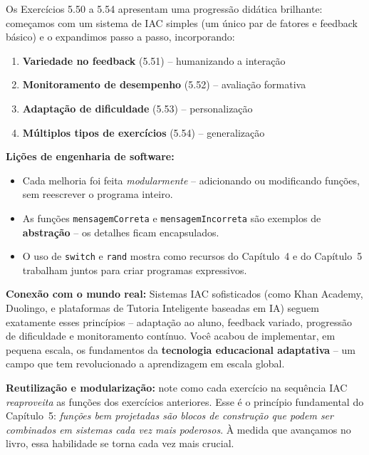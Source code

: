 \documentclass[12pt,a4paper]{article}
\begin{document}
\begin{tcolorbox}[colback=ecolightgreen,colframe=ecogreen,
  title={\bfseries A jornada da Instrução Auxiliada por Computador}]

Os Exercícios 5.50 a 5.54 apresentam uma progressão didática brilhante: começamos
com um sistema de IAC simples (um único par de fatores e feedback básico) e o
expandimos passo a passo, incorporando:

\begin{enumerate}[noitemsep]
  \item \textbf{Variedade no feedback} (5.51) -- humanizando a interação
  \item \textbf{Monitoramento de desempenho} (5.52) -- avaliação formativa
  \item \textbf{Adaptação de dificuldade} (5.53) -- personalização
  \item \textbf{Múltiplos tipos de exercícios} (5.54) -- generalização
\end{enumerate}

\textbf{Lições de engenharia de software:}
\begin{itemize}[noitemsep]
  \item Cada melhoria foi feita \textit{modularmente} -- adicionando ou modificando
  funções, sem reescrever o programa inteiro.
  \item As funções \texttt{mensagemCorreta} e \texttt{mensagemIncorreta} são
  exemplos de \textbf{abstração} -- os detalhes ficam encapsulados.
  \item O uso de \texttt{switch} e \texttt{rand} mostra como recursos do
  Capítulo~4 e do Capítulo~5 trabalham juntos para criar programas expressivos.
\end{itemize}

\textbf{Conexão com o mundo real:} Sistemas IAC sofisticados (como Khan Academy,
Duolingo, e plataformas de Tutoria Inteligente baseadas em IA) seguem exatamente
esses princípios -- adaptação ao aluno, feedback variado, progressão de dificuldade
e monitoramento contínuo. Você acabou de implementar, em pequena escala, os
fundamentos da \textbf{tecnologia educacional adaptativa} -- um campo que tem
revolucionado a aprendizagem em escala global.
\end{tcolorbox}

\bigskip

\begin{boaprática}
  \textbf{Reutilização e modularização:} note como cada exercício na sequência
  IAC \textit{reaproveita} as funções dos exercícios anteriores. Esse é o
  princípio fundamental do Capítulo~5: \textit{funções bem projetadas são
  blocos de construção que podem ser combinados em sistemas cada vez mais
  poderosos}. À medida que avançamos no livro, essa habilidade se torna cada
  vez mais crucial.
\end{boaprática}
\end{document}
